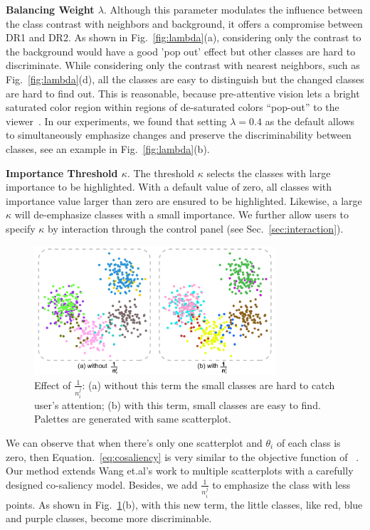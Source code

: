 \noindent\textbf{Balancing Weight $\lambda$}.
Although this parameter modulates the influence between the class contrast with neighbors and background, it offers a compromise between DR1 and DR2.
As shown in Fig.~\ref{fig:lambda}(a), considering only the contrast to the background would have a good 'pop out' effect but other classes are hard to discriminate. While considering only the contrast with nearest neighbors, such as Fig.~\ref{fig:lambda}(d), all the classes are easy to distinguish but the changed classes are hard to find out.
This is reasonable, because pre-attentive vision
lets a bright saturated color region within  regions of de-saturated colors ``pop-out'' to the viewer~\cite{healey1995visualizing}.
In our experiments, we found that setting  $\lambda=0.4$ as the default allows to simultaneously emphasize changes and preserve the discriminability between classes, see an example in Fig.~\ref{fig:lambda}(b).


\vspace{1.5mm}
\noindent\textbf{Importance Threshold $\kappa$}.
The threshold $\kappa$ selects the classes with large importance to be highlighted.
With a default value of zero, all classes with importance value larger than zero are ensured to be highlighted. Likewise, a large $\kappa$ will de-emphasize classes with a small importance.
We further allow users to specify $\kappa$ by interaction through the control panel (see Sec.~\ref{sec:interaction}).

\begin{figure}[h]
\centering
\includegraphics[width=0.8\textwidth]{figures/nij.pdf}
\caption{Effect of $\frac{1}{n^j_i}$: (a) without this term the small classes are hard to catch user's attention; (b) with this term, small classes are easy to find. Palettes are generated with same scatterplot.}
\vspace*{-3mm}
\label{fig:nij}
\end{figure}

We can observe that when there's only one scatterplot and $\theta_i$ of each class is zero, then Equation.~\ref{eq:cosaliency} is very similar to the objective function of ~\cite{Wang2018}. Our method extends Wang et.al's work to multiple scatterplots with a carefully designed co-saliency model. Besides, we add $\frac{1}{n^j_i}$ to emphasize the class with less points. As shown in Fig.~\ref{fig:nij}(b), with this new term, the little classes, like red, blue and purple classes, become more discriminable.
